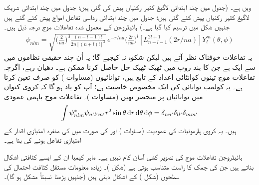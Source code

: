   ویں  ہے۔ (جدول  میں چند ابتدائی لاگیغ  کثیر رکنیاں  پیش کی گئی ہیں؛ جدول  میں چند ابتدائی شریک لاگیغ  کثیر رکنیاں پیش کئے گئی ہیں؛  جدول  میں چند ابتدائی رداسی تفاعل امواج پیش کئے گئے ہیں جنہیں شکل    میں ترسیم کیا گیا ہے۔) ہائیڈروجن کے معمول شدہ تفاعلات موج درجہ ذیل ہیں۔
  \begin{align}
\psi_{nlm}=\sqrt{\big(\frac{2}{na}\big)^3\frac{(n-l-1)!}{2n[(n+l)!]^{3}}}\,e^{-r/na}\big(\frac{2r}{na}\big)^{l}[L_{n-l-1}^{2l+1}(2r/na)]Y_{l}^{m}(\theta,\phi)
\end{align}
یہ تفاعلات خوفناک نظر آتے ہیں لیکن شکوہ  نہ کیجیے گا؛ یہ اُن چند حقیقی نظاموں میں سے ایک ہے جن کا  بند روپ میں ٹھیک ٹھیک حل حاصل کرنا ممکن ہے۔  دھیان رہے، اگرچہ تفاعلات موج تینوں کوانٹائی اعداد کے تابع ہیں، توانائیوں (مساوات ) کو صرف  تعین کرتا ہے۔ یہ کولمب توانائی کی ایک مخصوص خاصیت ہے؛ آپ کو یاد ہو گا کہ کروی کنواں میں توانائیاں  پر منحصر تھیں (مساوات )۔ تفاعلات موج باہمی عمودی 
\begin{align}
\int\psi_{nlm}^{*}\psi_{n'l'm'}r^{2}\sin\theta\dif r\dif\theta\dif\phi=\delta_{nn'}\delta_{ll'}\delta_{mm'} 
\end{align}
ہیں۔ یہ کروی ہارمونیات کی عمودیت (مساوات )  اور  کی صورت میں   کی منفرد امتیازی  اقدار کے امتیازی تفاعل ہونے کی بنا ہے۔

ہائیڈروجن تفاعلات موج کی تصویر کشی آسان کام نہیں ہے۔  ماہر کیمیا ان کے ایسے کثافتی اشکال بناتے ہیں جن کی چمک  
کا راست متناسب ہوتی ہے (شکل )۔ زیادہ معلومات مستقل کثافت احتمال کی سطحوں (شکل ) کے اشکال دیتی ہیں (جنہیں پڑھنا  نسبتاً مشکل ہو گا)۔

